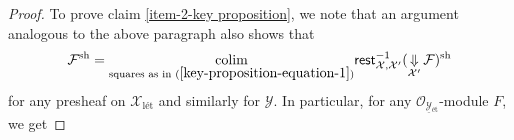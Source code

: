 \documentclass[11pt]{amsart}
\theoremstyle{definition}
\theoremstyle{definition}
\DeclareMathOperator{\arrowdown}{\!\Downarrow\!}
\newcommand{\cF}{\mathcal{F}}
\newcommand{\cO}{\mathcal{O}}
\newcommand{\cX}{\mathcal{X}}
\newcommand{\cY}{\mathcal{Y}}
\newcommand{\ul}[1]{\underline{#1}}
\newcommand{\cal}{\mathcal}
\def\cF{{\cal F}}
\def\cO{{\cal O}}
\def\cX{{\cal X}}
\def\cY{{\cal Y}}
\begin{document}
\begin{proof}

To prove claim \eqref{item-2-key proposition}, we note that an argument analogous to the above paragraph also shows that 
\begin{equation}\label{equation: second time sh is written differently}
    \cF^{\text{sh}} = \underset{\text{squares as in (}\ref{key-proposition-equation-1}\text{)}}{\mathrm{colim}}\mathsf{rest}_{\cX,\cX'}^{-1} (\arrowdown_{\cX'}\mathcal{F})^{\text{sh}}
\end{equation}
for any presheaf on $\cX_{\text{l\'et}}$ and similarly for $\mathcal{Y}$.
In particular, for any $\cO_{\ul{\cY}{}_{\text{\'et}}}$-module $F$, we get

\end{proof}
\end{document}

